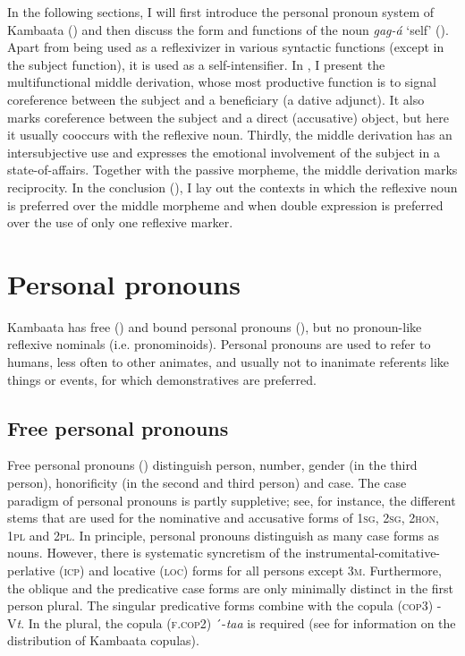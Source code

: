 \documentclass[output=paper]{langscibook}
\begin{document}
In the following sections, I will first introduce the personal pronoun system of Kambaata () and then discuss the form and functions of the noun \textit{gag-á} ‘self’ (). Apart from being used as a reflexivizer in various syntactic functions (except in the subject function), it is used as a self-intensifier. In , I present the multifunctional middle derivation, whose most productive function is to signal coreference between the subject and a beneficiary (a dative adjunct). It also marks coreference between the subject and a direct (accusative) object, but here it usually cooccurs with the reflexive noun. Thirdly, the middle derivation has an intersubjective use and expresses the emotional involvement of the subject in a state-of-affairs. Together with the passive morpheme, the middle derivation marks reciprocity. In the conclusion (), I lay out the contexts in which the reflexive noun is preferred over the middle morpheme and when double expression is preferred over the use of only one reflexive marker.

\section{Personal pronouns}\label{sec:treis:2}

Kambaata has free () and bound personal pronouns (), but no pronoun-like reflexive nominals (i.e. pronominoids). Personal pronouns are used to refer to humans, less often to other animates, and usually not to inanimate referents like things or events, for which demonstratives are preferred.

\subsection{Free personal pronouns}\label{sec:treis:2.1}

Free personal pronouns () distinguish person, number, gender (in the third person), honorificity (in the second and third person) and case. The case paradigm of personal pronouns is partly suppletive; see, for instance, the different stems that are used for the nominative and accusative forms of \textsc{1sg,} \textsc{2sg}, \textsc{2hon,} \textsc{1pl} and \textsc{2pl}. In principle, personal pronouns distinguish as many case forms as nouns. However, there is systematic syncretism of the instrumental-comitative-perlative \textsc{(icp)} and locative \textsc{(loc)} forms for all persons except \textsc{3m}. Furthermore, the oblique and the predicative case forms are only minimally distinct in the first person plural. The singular predicative forms combine with the copula (\textsc{cop3}) \nobreakdash-V\textit{t}. In the plural, the copula (\textsc{f.cop2)} ´-\textit{taa} is required (see \citealt[397-426]{Treis2008} for information on the distribution of Kambaata copulas).
\end{document}
